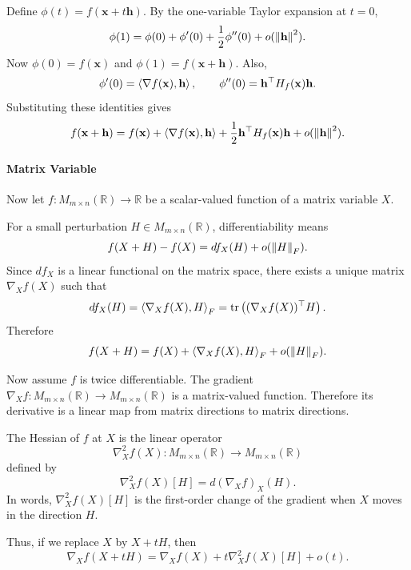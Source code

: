 \begin{pfbox}
Define $\phi(t)=f(\mathbf{x}+t\mathbf{h})$. By the one-variable Taylor expansion
at $t=0$,
\[
    \phi(1)
    =
    \phi(0)+\phi'(0)+\frac12\phi''(0)+o(\left\lVert \mathbf{h} \right\rVert^2).
\]
Now $\phi(0)=f(\mathbf{x})$ and $\phi(1)=f(\mathbf{x}+\mathbf{h})$. Also,
\[
    \phi'(0)
    =
    \left\langle \nabla f(\mathbf{x}), \mathbf{h} \right\rangle,
    \qquad
    \phi''(0)
    =
    \mathbf{h}^{\top}H_f(\mathbf{x})\mathbf{h}.
\]
Substituting these identities gives
\[
    f(\mathbf{x}+\mathbf{h})
    =
    f(\mathbf{x})
    +
    \left\langle \nabla f(\mathbf{x}), \mathbf{h} \right\rangle
    +
    \frac12\mathbf{h}^{\top}H_f(\mathbf{x})\mathbf{h}
    +
    o(\left\lVert \mathbf{h} \right\rVert^2).
\]
\end{pfbox}


\paragraph*{Matrix Variable}

Now let $f:M_{m\times n}(\mathbb{R})\to\mathbb{R}$ be a scalar-valued function
of a matrix variable $X$. 

For a small perturbation $H\in M_{m\times n}(\mathbb{R})$, differentiability
means
\[
    f(X+H)-f(X)
    =
    df_X(H)+o(\left\lVert H \right\rVert_F).
\]
Since $df_X$ is a linear functional on the matrix space, there exists a unique
matrix $\nabla_X f(X)$ such that
\[
    df_X(H)
    =
    \left\langle \nabla_X f(X), H \right\rangle_F
    =
    \operatorname{tr}\left((\nabla_Xf(X))^\top H\right).
\]
Therefore
\[
    f(X+H)
    =
    f(X)
    +
    \left\langle \nabla_X f(X), H \right\rangle_F
    +
    o(\left\lVert H \right\rVert_F).
\]

Now assume $f$ is twice differentiable. The gradient
$\nabla_X f:M_{m\times n}(\mathbb{R})\to M_{m\times n}(\mathbb{R})$ is a
matrix-valued function. Therefore its derivative is a linear map from matrix
directions to matrix directions.

\begin{definition}
The Hessian of $f$ at $X$ is the linear operator
\[
    \nabla_X^2 f(X):
    M_{m\times n}(\mathbb{R})\to M_{m\times n}(\mathbb{R})
\]
defined by
\[
    \nabla_X^2 f(X)[H]
    =
    d(\nabla_X f)_X(H).
\]
In words, $\nabla_X^2f(X)[H]$ is the first-order change of the gradient when
$X$ moves in the direction $H$.
\end{definition}

Thus, if we replace $X$ by $X+tH$, then
\[
    \nabla_X f(X+tH)
    =
    \nabla_X f(X)
    +
    t\nabla_X^2 f(X)[H]
    +
    o(t).
\]

